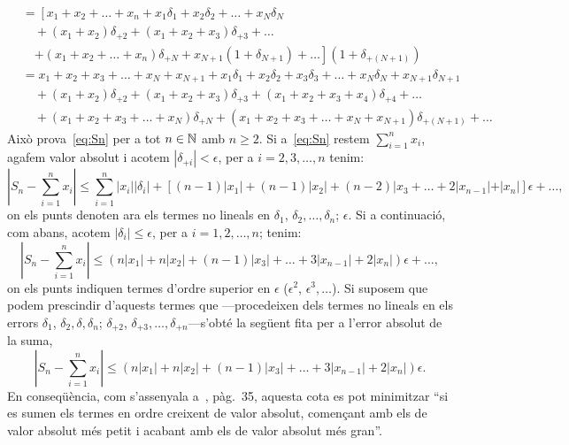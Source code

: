 \documentclass[a4paper,twoside,12pt]{exam}
\begin{document}
\begin{questions}
\begin{solution}
\begin{align*}
			&= \left[
			        x_{1} + x_{2} + \dots + x_{n} 
			          + x_{1}\delta_{1} + x_{2}\delta_{2} 
				  + \dots + x_{N}\delta_{N}\right.\\
			&\quad+\left(x_{1} + x_{2}\right)\delta_{+2}
				  + \left(x_{1} + x_{2} +
				  x_{3}\right)\delta_{+3}+ \dots\\
			&\quad\left.
				  + \left(x_{1} + x_{2} + \dots 
				  + x_{n}\right)\delta_{+N} 
				  + x_{N+1}\left(1 + \delta_{N+1}\right)
				  +\dots\right]
				  \left(1 + \delta_{+(N+1)}\right)\\
			&= x_{1} + x_{2} + x_{3} + \dots + 
				   x_{N} + x_{N+1}
				 + x_{1}\delta_{1} + x_{2}\delta_{2} 
				+ x_{3}\delta_{3} + \dots 
				+ x_{N}\delta_{N} 
				+ x_{N+1}\delta_{N+1}\\
			&\quad  + \left(x_{1} + x_{2}\right)\delta_{+2}
			        + \left(x_{1} + x_{2} + x_{3}\right)\delta_{+3}
			        + \left(x_{1} + x_{2} + x_{3} 
				        + x_{4}\right)\delta_{+4}
				+ \dots\\
			&\quad  + \left(x_{1} + x_{2} + x_{3} +\dots 
					+ x_{N}\right)\delta_{+N}
					+ \left(x_{1} + x_{2} + x_{3}+\dots 
						+ x_{N} + x_{N+1}\right)
						\delta_{+(N+1)} + \dots
	\end{align*}
	Això prova~\eqref{eq:Sn} per a tot $n\in\mathbb{N}$ amb $n\ge 2$. Si
	a~\eqref{eq:Sn} restem $\sum_{i=1}^{n}x_{i}$, agafem valor absolut i acotem
	$|\delta_{+i}| < \epsilon$, per a $i=2,3,\dots,n$ tenim:
	\begin{displaymath}
		\left|S_{n} - \sum\limits_{i=1}^{n}x_{i}\right| \le
		\sum_{i=1}^{n} |x_{i}||\delta_{i}| + 
		\left[(n-1)|x_{1}| + (n-1)|x_{2}| +
		(n-2)|x_{3} + \dots + 2|x_{n-1}| + |x_{n}|\right]
		\epsilon + \dots,
	\end{displaymath}
	on els punts denoten ara els termes no lineals en $\delta_{1}$,
	$\delta_{2},\dots,\delta_{n}$; $\epsilon$. Si a continuació, com abans,
	acotem $|\delta_{i}|\le\epsilon$, per a $i=1,2,\dots,n$; tenim:
	\begin{displaymath}
		\left|S_{n} - \sum\limits_{i=1}^{n}x_{i}\right| \le
		\left(n|x_{1}| + n|x_{2}| + (n-1)|x_{3}| 
		+ \dots + 3|x_{n-1}| + 2|x_{n}|\right)\epsilon + \dots,
	\end{displaymath}
	on els punts indiquen termes d'ordre superior en $\epsilon$
	($\epsilon^{2}$, $\epsilon^{3},\dots$). Si suposem que podem prescindir
	d'aquests termes que ---procedeixen dels termes no lineals en els errors
	$\delta_{1}$, $\delta_{2},\delta,\delta_{n}$; $\delta_{+2}$,
	$\delta_{+3},\dots,\delta_{+n}$---s'obté la següent fita per a l'error  
	absolut de la suma,
	\begin{equation}\label{eq:BoundErrorS}
		\left|S_{n} - \sum\limits_{i=1}^{n}x_{i}\right| \le
		\left(n|x_{1}| + n|x_{2}| + (n-1)|x_{3}| 
		+ \dots + 3|x_{n-1}| + 2|x_{n}|\right)\epsilon. 
	\end{equation}
	En conseqüència, com s'assenyala a~\cite{AubanellBD91}, pàg.~35,
	aquesta cota es pot minimitzar ``si es sumen els termes en ordre
	creixent de valor absolut, començant amb els de valor absolut més petit
	i acabant amb els de valor absolut més gran''.
\end{solution}


\end{questions}
\end{document}
